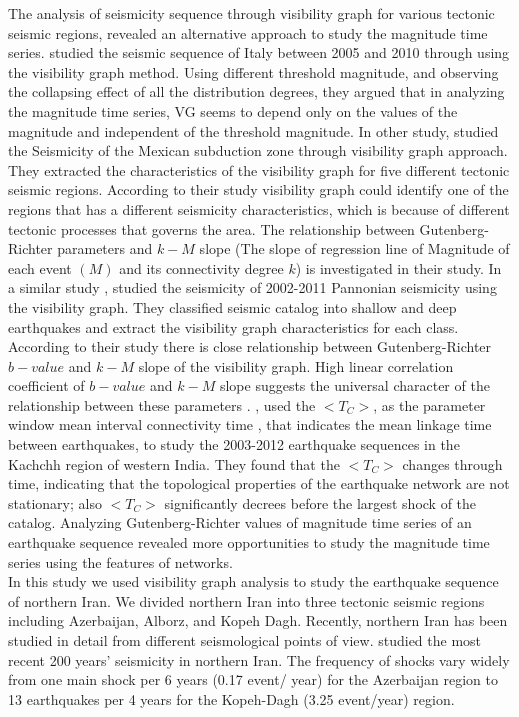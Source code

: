 \noindent
The analysis of seismicity sequence through visibility graph for various tectonic seismic regions, revealed an alternative approach to study the magnitude time series. \citet{Telesca2012} studied the seismic sequence of Italy between 2005 and 2010 through using the visibility graph method. Using different threshold magnitude, and observing the collapsing effect of all the distribution degrees, they argued that in analyzing the magnitude time series, VG seems to depend only on the values of the magnitude and independent of the threshold magnitude. In other study, \citet{Telesca2013} studied the Seismicity of the Mexican subduction zone through visibility graph approach. They extracted the characteristics of the visibility graph for five different tectonic seismic regions.  According to their study visibility graph could identify one of the regions that has a different seismicity characteristics, which is because of different tectonic processes that governs the area. The relationship between Gutenberg-Richter parameters and $k-M$ slope (The slope of regression line of Magnitude  of each event $(M)$ and its connectivity degree $k$) is investigated in their study. In a similar study \citet{Telesca2014}, studied the seismicity of 2002-2011 Pannonian seismicity using the visibility graph. They classified seismic catalog into shallow and deep earthquakes and extract the visibility graph characteristics for each class. According to their study there is close relationship between Gutenberg-Richter $b-value$ and $k-M$ slope of the visibility graph. High linear correlation coefficient of $b-value$ and $k-M$ slope suggests the universal character of the relationship between these parameters \citep{Telesca2014}.  \citet{Telesca2016} , used the $ <T_C>$, as the parameter window mean interval connectivity time ,  that indicates the mean linkage time between earthquakes, to study the 2003-2012 earthquake sequences in the Kachchh region of western India. They found that the $<T_C>$ changes through time, indicating that the topological properties of the earthquake network are not stationary; also $<T_C>$ significantly decrees before the largest shock of the catalog. Analyzing Gutenberg-Richter values of  magnitude time series of an earthquake sequence revealed more opportunities to study the magnitude time series using the features of networks. \\

\noindent
In this study we used visibility graph analysis to study the earthquake sequence of northern Iran. We divided northern Iran into three tectonic seismic regions including Azerbaijan, Alborz, and Kopeh Dagh.  Recently, northern Iran has been studied in detail from different seismological points of view. \citet{Nemati2015} studied the most recent 200 years' seismicity in northern Iran. The frequency of shocks vary widely from one main shock per 6 years (0.17 event/ year) for the Azerbaijan region to 13 earthquakes per 4 years for the Kopeh-Dagh (3.25 event/year) region. \\

